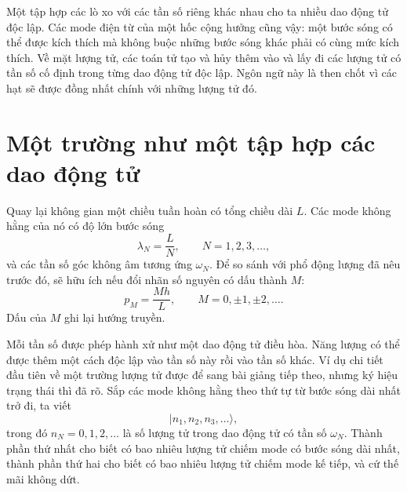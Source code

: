 \begin{classroomqa}
\end{classroomqa}

Một tập hợp các lò xo với các tần số riêng khác nhau cho ta nhiều dao động tử độc lập. Các mode điện từ của một hốc cộng hưởng cũng vậy: một bước sóng có thể được kích thích mà không buộc những bước sóng khác phải có cùng mức kích thích. Về mặt lượng tử, các toán tử tạo và hủy thêm vào và lấy đi các lượng tử có tần số cố định trong từng dao động tử độc lập. Ngôn ngữ này là then chốt vì các hạt sẽ được đồng nhất chính với những lượng tử đó.

\section{Một trường như một tập hợp các dao động tử}

Quay lại không gian một chiều tuần hoàn có tổng chiều dài \(L\). Các mode không hằng của nó có độ lớn bước sóng
\begin{equation}
\lambda_N=\frac{L}{N},
\qquad N=1,2,3,\ldots ,
\end{equation}
và các tần số góc không âm tương ứng \(\omega_N\). Để so sánh với phổ động lượng đã nêu trước đó, sẽ hữu ích nếu đổi nhãn số nguyên có dấu thành \(M\):
\begin{equation}
p_M=\frac{Mh}{L},
\qquad M=0,\pm1,\pm2,\ldots .
\end{equation}
Dấu của \(M\) ghi lại hướng truyền.

Mỗi tần số được phép hành xử như một dao động tử điều hòa. Năng lượng có thể được thêm một cách độc lập vào tần số này rồi vào tần số khác. Ví dụ chi tiết đầu tiên về một trường lượng tử được để sang bài giảng tiếp theo, nhưng ký hiệu trạng thái thì đã rõ. Sắp các mode không hằng theo thứ tự từ bước sóng dài nhất trở đi, ta viết
\begin{equation}
|n_1,n_2,n_3,\ldots\rangle,
\end{equation}
trong đó \(n_N=0,1,2,\ldots\) là số lượng tử trong dao động tử có tần số \(\omega_N\). Thành phần thứ nhất cho biết có bao nhiêu lượng tử chiếm mode có bước sóng dài nhất, thành phần thứ hai cho biết có bao nhiêu lượng tử chiếm mode kế tiếp, và cứ thế mãi không dứt.

